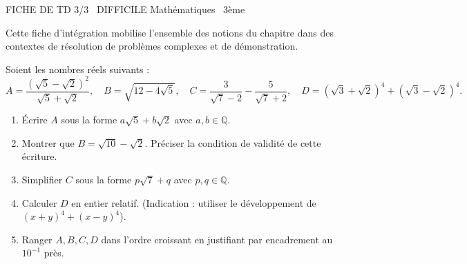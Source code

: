 \documentclass[11pt]{article}
\begin{document}
\begin{tcolorbox}[enhanced,colback=popink,colframe=popink,arc=10pt,boxrule=0pt,left=12pt,right=12pt,top=9pt,bottom=9pt]
{\color{white}\popxbold\small FICHE DE TD 3/3 \textbullet\ DIFFICILE \hfill Mathématiques \textbullet\ 3ème\par}
\end{tcolorbox}
\vspace{4pt}
Cette fiche d'intégration mobilise l'ensemble des notions du chapitre dans des contextes de résolution de problèmes complexes et de démonstration.

\begin{exercice}
Soient les nombres réels suivants :
\[
A = \frac{(\sqrt{5} - \sqrt{2})^2}{\sqrt{5} + \sqrt{2}},\quad 
B = \sqrt{12 - 4\sqrt{5}},\quad 
C = \frac{3}{\sqrt{7} - 2} - \frac{5}{\sqrt{7} + 2},\quad 
D = (\sqrt{3} + \sqrt{2})^4 + (\sqrt{3} - \sqrt{2})^4.
\]
\begin{enumerate}
    \item Écrire $A$ sous la forme $a\sqrt{5} + b\sqrt{2}$ avec $a,b \in \mathbb{Q}$.
    \item Montrer que $B = \sqrt{10} - \sqrt{2}$. Préciser la condition de validité de cette écriture.
    \item Simplifier $C$ sous la forme $p\sqrt{7} + q$ avec $p,q \in \mathbb{Q}$.
    \item Calculer $D$ en entier relatif. (Indication : utiliser le développement de $(x+y)^4 + (x-y)^4$).
    \item Ranger $A, B, C, D$ dans l'ordre croissant en justifiant par encadrement au $10^{-1}$ près.
\end{enumerate}
\end{exercice}
\end{document}

